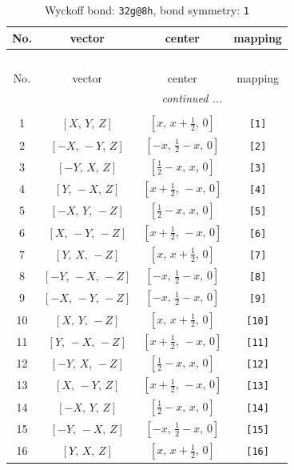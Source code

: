 \documentclass[fleqn,8pt]{jsarticle}
\begin{document}
\begin{longtable}{cccc}
\caption{Wyckoff bond: {\tt 32g@8h}, bond symmetry: {\tt 1}}
 \\
 \hline \hline
No. & vector & center & mapping \\ \hline \endfirsthead

\multicolumn{3}{l}{\tablename\ \thetable{}} \\
 \hline \hline
No. & vector & center & mapping \\ \hline \endhead

 \hline \hline
\multicolumn{3}{r}{\footnotesize\it continued ...} \\ \endfoot

 \hline \hline
\multicolumn{3}{r}{} \\ \endlastfoot

1 & $\left[ X,\, Y,\, Z \right]$ & $\left[ x,\, x + \frac{1}{2},\, 0 \right]$ & {\tt [1]} \\ \hline
2 & $\left[ - X,\, - Y,\, Z \right]$ & $\left[ - x,\, \frac{1}{2} - x,\, 0 \right]$ & {\tt [2]} \\ \hline
3 & $\left[ - Y,\, X,\, Z \right]$ & $\left[ \frac{1}{2} - x,\, x,\, 0 \right]$ & {\tt [3]} \\ \hline
4 & $\left[ Y,\, - X,\, Z \right]$ & $\left[ x + \frac{1}{2},\, - x,\, 0 \right]$ & {\tt [4]} \\ \hline
5 & $\left[ - X,\, Y,\, - Z \right]$ & $\left[ \frac{1}{2} - x,\, x,\, 0 \right]$ & {\tt [5]} \\ \hline
6 & $\left[ X,\, - Y,\, - Z \right]$ & $\left[ x + \frac{1}{2},\, - x,\, 0 \right]$ & {\tt [6]} \\ \hline
7 & $\left[ Y,\, X,\, - Z \right]$ & $\left[ x,\, x + \frac{1}{2},\, 0 \right]$ & {\tt [7]} \\ \hline
8 & $\left[ - Y,\, - X,\, - Z \right]$ & $\left[ - x,\, \frac{1}{2} - x,\, 0 \right]$ & {\tt [8]} \\ \hline
9 & $\left[ - X,\, - Y,\, - Z \right]$ & $\left[ - x,\, \frac{1}{2} - x,\, 0 \right]$ & {\tt [9]} \\ \hline
10 & $\left[ X,\, Y,\, - Z \right]$ & $\left[ x,\, x + \frac{1}{2},\, 0 \right]$ & {\tt [10]} \\ \hline
11 & $\left[ Y,\, - X,\, - Z \right]$ & $\left[ x + \frac{1}{2},\, - x,\, 0 \right]$ & {\tt [11]} \\ \hline
12 & $\left[ - Y,\, X,\, - Z \right]$ & $\left[ \frac{1}{2} - x,\, x,\, 0 \right]$ & {\tt [12]} \\ \hline
13 & $\left[ X,\, - Y,\, Z \right]$ & $\left[ x + \frac{1}{2},\, - x,\, 0 \right]$ & {\tt [13]} \\ \hline
14 & $\left[ - X,\, Y,\, Z \right]$ & $\left[ \frac{1}{2} - x,\, x,\, 0 \right]$ & {\tt [14]} \\ \hline
15 & $\left[ - Y,\, - X,\, Z \right]$ & $\left[ - x,\, \frac{1}{2} - x,\, 0 \right]$ & {\tt [15]} \\ \hline
16 & $\left[ Y,\, X,\, Z \right]$ & $\left[ x,\, x + \frac{1}{2},\, 0 \right]$ & {\tt [16]} \\
\end{longtable}
\end{document}
